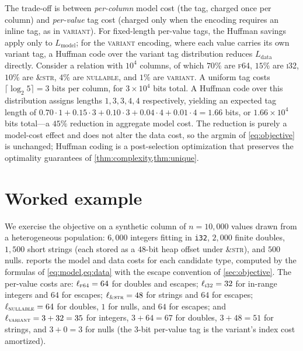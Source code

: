 \documentclass[10pt]{article}
\theoremstyle{definition}
\theoremstyle{remark}
\newcommand{\Lmodel}{L_{\mathrm{model}}}
\newcommand{\Ldata}{L_{\mathrm{data}}}
\begin{document}
The trade-off is between \emph{per-column} model cost (the tag, charged
once per column) and \emph{per-value} tag cost (charged only when the
encoding requires an inline tag, as in \textsc{variant}). For
fixed-length per-value tags, the Huffman savings apply only to
$\Lmodel$; for the \textsc{variant} encoding, where each value carries
its own variant tag, a Huffman code over the variant tag distribution
reduces $\Ldata$ directly. Consider a relation with $10^4$ columns, of
which $70\%$ are \textsc{f64}, $15\%$ are \textsc{i32}, $10\%$ are
\textsc{\&str}, $4\%$ are \textsc{nullable}, and $1\%$ are
\textsc{variant}. A uniform tag costs $\lceil \log_2 5 \rceil = 3$ bits
per column, for $3 \times 10^4$ bits total. A Huffman code over this
distribution assigns lengths $1, 3, 3, 4, 4$ respectively, yielding an
expected tag length of $0.70 \cdot 1 + 0.15 \cdot 3 + 0.10 \cdot 3 +
0.04 \cdot 4 + 0.01 \cdot 4 = 1.66$ bits, or $1.66 \times 10^4$ bits
total---a $45\%$ reduction in aggregate model cost. The reduction is
purely a model-cost effect and does not alter the data cost, so the
argmin of \cref{eq:objective} is unchanged; Huffman coding is a
post-selection optimization that preserves the optimality guarantees of
\cref{thm:complexity,thm:unique}.

\section{Worked example}\label{sec:worked}

We exercise the objective on a synthetic column of $n = 10{,}000$ values
drawn from a heterogeneous population: $6{,}000$ integers fitting in
\texttt{i32}, $2{,}000$ finite doubles, $1{,}500$ short strings (each
stored as a $48$-bit heap offset under \textsc{\&str}), and $500$ nulls.
 reports the model and data costs for each candidate
type, computed by the formulas of \cref{eq:model,eq:data} with the escape
convention of \cref{sec:objective}. The per-value costs are:
$\ell_{\textsc{f64}} = 64$ for doubles and escapes;
$\ell_{\textsc{i32}} = 32$ for in-range integers and $64$ for escapes;
$\ell_{\textsc{\&str}} = 48$ for strings and $64$ for escapes;
$\ell_{\textsc{nullable}} = 64$ for doubles, $1$ for nulls, and $64$ for
escapes; and $\ell_{\textsc{variant}} = 3 + 32 = 35$ for integers,
$3 + 64 = 67$ for doubles, $3 + 48 = 51$ for strings, and $3 + 0 = 3$ for
nulls (the $3$-bit per-value tag is the variant's index cost amortized).
\end{document}
